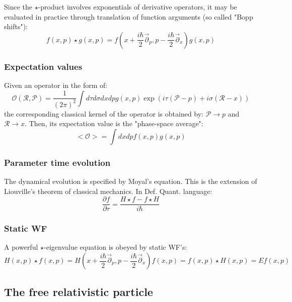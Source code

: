 \documentclass[a4paper,10pt]{article}
\numberwithin{equation}{section}
\newcommand{\parr}{\overset{\rightarrow}{\partial}}
\begin{document}
Since the $\star$-product involves exponentials of derivative operators, it may be evaluated in practice through translation of function arguments (so called "Bopp shifts"):
\begin{equation}
    f(x,p)\star g(x,p) = f(x + \frac{i\hbar}{2}\parr_p,p - \frac{i\hbar}{2}\parr_x)g(x,p)
\end{equation}

\subsubsection{Expectation values}
Given an operator in the form of:
\begin{equation}
    \mathcal{O} (\mathcal{R}, \mathcal{P}) = \frac{1}{(2\pi)^2} \int d \tau d\sigma dx dp g(x,p) \exp (i\tau(\mathcal{P} - p) + i \sigma (\mathcal{R} - x))
\end{equation}
the corresponding classical kernel of the operator is obtained by: $\mathcal{P} \rightarrow p$ and $\mathcal{R}\rightarrow x$. Then, its expectation value is the "phase-space average":
\begin{equation}
    <\mathcal{O}> = \int dx dp f(x,p) g(x,p)
\end{equation}

\subsubsection{Parameter time evolution}
The dynamical evolution is specified by Moyal's equation. This is the extension of Liouville's theorem of classical mechanics. In Def. Quant. language:
\begin{equation}
    \frac{\partial f}{\partial \tau} = \frac{H \star f - f \star H}{i \hbar}
    \label{parametertimeevolution}
\end{equation}


\subsubsection{Static WF}

A powerful $\star$-eigenvalue equation is obeyed by static WF's:
\begin{equation}
    H(x,p)\star f(x,p) = H(x + \frac{i\hbar}{2}\parr_p,p - \frac{i\hbar}{2}\parr_x)f(x,p) = f(x,p) \star H(x,p) = Ef(x,p)
\end{equation}


\newpage

\subsection{The free relativistic particle}
\end{document}
